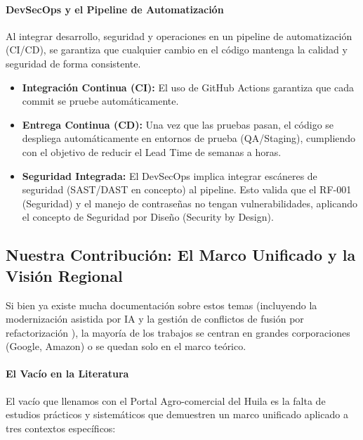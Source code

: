 
\paragraph{DevSecOps y el Pipeline de Automatización}

Al integrar desarrollo, seguridad y operaciones en un pipeline de automatización (CI/CD), se garantiza que cualquier cambio en el código mantenga la calidad y seguridad de forma consistente.

\begin{itemize}
\item \textbf{Integración Continua (CI):} El uso de GitHub Actions garantiza que cada commit se pruebe automáticamente.

\item \textbf{Entrega Continua (CD):} Una vez que las pruebas pasan, el código se despliega automáticamente en entornos de prueba (QA/Staging), cumpliendo con el objetivo de reducir el Lead Time de semanas a horas.

\item \textbf{Seguridad Integrada:} El DevSecOps implica integrar escáneres de seguridad (SAST/DAST en concepto) al pipeline. Esto valida que el RF-001 (Seguridad) y el manejo de contraseñas no tengan vulnerabilidades, aplicando el concepto de Seguridad por Diseño (Security by Design).
\end{itemize}

\subsection{Nuestra Contribución: El Marco Unificado y la Visión Regional}

Si bien ya existe mucha documentación sobre estos temas (incluyendo la modernización asistida por IA \cite{ia2025} y la gestión de conflictos de fusión por refactorización \cite{fusion2020}), la mayoría de los trabajos se centran en grandes corporaciones (Google, Amazon) o se quedan solo en el marco teórico.

\paragraph{El Vacío en la Literatura}

El vacío que llenamos con el Portal Agro-comercial del Huila es la falta de estudios prácticos y sistemáticos que demuestren un marco unificado aplicado a tres contextos específicos:

